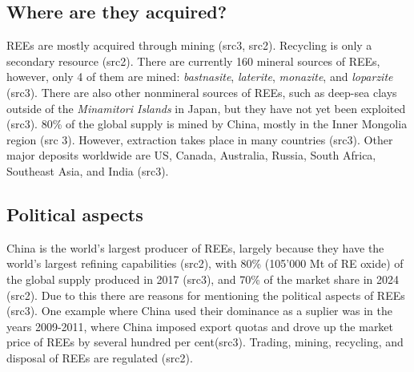 \subsection{Where are they acquired?}

REEs are mostly acquired through mining (src3, src2). Recycling is only a secondary resource (src2). There are currently 160 mineral sources of REEs, however, only 4 of them are mined: \textit{bastnasite}, \textit{laterite}, \textit{monazite}, and \textit{loparzite} (src3). There are also other nonmineral sources of REEs, such as deep-sea clays outside of the \textit{Minamitori Islands} in Japan, but they have not yet been exploited (src3). 80\% of the global supply is mined by China, mostly in the Inner Mongolia region (src 3). However, extraction takes place in many countries (src3). Other major deposits worldwide are US, Canada, Australia, Russia, South Africa, Southeast Asia, and India (src3).

\subsection{Political aspects}

China is the world's largest producer of REEs, largely because they have the world's largest refining capabilities (src2), with 80\% (105'000 Mt of RE oxide) of the global supply produced in 2017 (src3), and 70\% of the market share in 2024 (src2). Due to this there are reasons for mentioning the political aspects of REEs (src3). One example where China used their dominance as a suplier was in the years 2009-2011, where China imposed export quotas and drove up the market price of REEs by several hundred per cent(src3). Trading, mining, recycling, and disposal of REEs are regulated (src2).